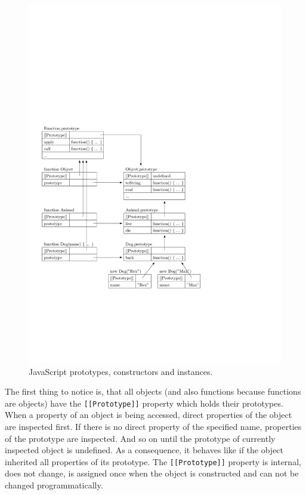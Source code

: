 \documentclass[12pt,a4paper]{report}
\begin{document}
\begin{figure}[ht]
  \centering
	\includegraphics{img/JavaScriptPrototypes.pdf}
	\caption{JavaScript prototypes, constructors and instances.}
	\label{JavaScriptInheritance}
\end{figure}

The first thing to notice is, that all objects (and also functions because functions are objects) have the \texttt{[[Prototype]]} property which holds their prototypes. When a property of an object is being accessed, direct properties of the object are inspected first. If there is no direct property of the specified name, properties of the prototype are inspected. And so on until the prototype of currently inspected object is undefined. As a consequence, it behaves like if the object inherited all properties of its prototype. The \texttt{[[Prototype]]} property is internal, does not change, is assigned once when the object is constructed and can not be changed programmatically.
\end{document}
